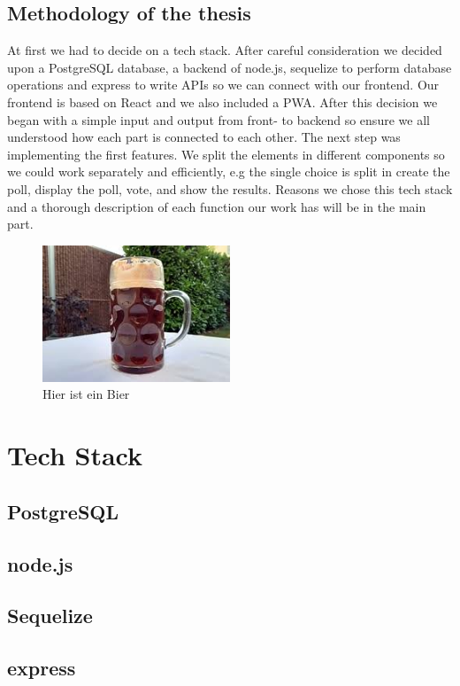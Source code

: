 \documentclass[a4paper,12pt]{report}
\begin{document}
\section{Methodology of the thesis}
At first we had to decide on a tech stack. After careful consideration we decided upon a PostgreSQL database, a backend of node.js, sequelize to perform database operations and express to write APIs so we can connect with our frontend. Our frontend is based on React and we also included a PWA. After this decision we began with a simple input and output from front- to backend so ensure we all understood how each part is connected to each other. The next step was implementing the first features. We split the elements in different components so we could work separately and efficiently, e.g the single choice is split in create the poll, display the poll, vote, and show the results. Reasons we chose this tech stack and a thorough description of each function our work has will be in the main part.  
\begin{figure}[h!]
    \centering
    \includegraphics[width=0.5\textwidth]{pics/beispiel.jpg}
    \caption{Hier ist ein Bier}
    \label{fig:beispielbild}
\end{figure}

\chapter{Tech Stack}
\section{PostgreSQL}
\section{node.js}
\section{Sequelize}
\section{express}
\end{document}
